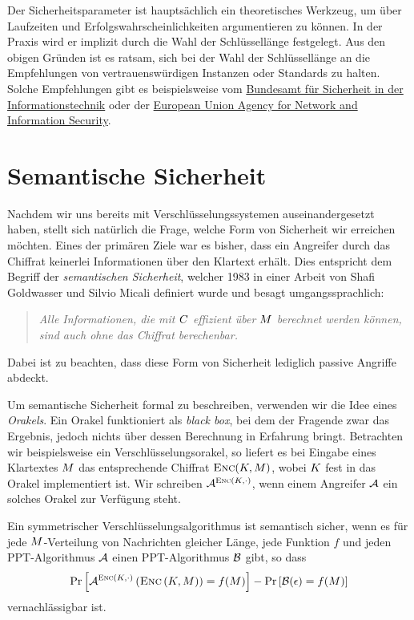 Der Sicherheitsparameter ist hauptsächlich ein theoretisches Werkzeug, um über Laufzeiten und Erfolgswahrscheinlichkeiten argumentieren zu können. In der Praxis wird er implizit durch die Wahl der Schlüssellänge festgelegt. Aus den obigen Gründen ist es ratsam, sich bei der Wahl der Schlüssellänge an die Empfehlungen von vertrauenswürdigen Instanzen oder Standards zu halten. Solche Empfehlungen gibt es beispielsweise vom \href{https://www.bsi.bund.de/DE/Publikationen/TechnischeRichtlinien/tr02102/index_htm.html}{Bundesamt für Sicherheit in der Informationstechnik} oder der \href{https://www.enisa.europa.eu/activities/identity-and-trust/library/deliverables/algorithms-key-size-and-parameters-report-2014}{European Union Agency for Network and Information Security}.

\section{Semantische Sicherheit}\label{ch:sicherheitsbegriffe:semantischesicherheit}
Nachdem wir uns bereits mit Verschlüsselungssystemen auseinandergesetzt haben, stellt sich natürlich die Frage, welche Form von Sicherheit wir erreichen möchten. 
Eines der primären Ziele war es bisher, dass ein Angreifer durch das Chiffrat keinerlei Informationen über den Klartext erhält. Dies entspricht dem Begriff der \emph{semantischen Sicherheit},
welcher 1983 in einer Arbeit von Shafi Goldwasser und Silvio Micali \cite{Goldwasser1984} definiert wurde und besagt umgangssprachlich:
\begin{quote}
	\emph{Alle Informationen, die mit $C$ effizient über $M$ berechnet werden können, sind auch ohne das Chiffrat berechenbar.}
\end{quote}
Dabei ist zu beachten, dass diese Form von Sicherheit lediglich passive Angriffe abdeckt.

Um semantische Sicherheit formal zu beschreiben, verwenden wir die Idee
eines \emph{Orakels}. Ein Orakel funktioniert als \emph{black box}, bei
dem der Fragende zwar das Ergebnis, jedoch nichts über dessen Berechnung
in Erfahrung bringt. Betrachten wir beispielsweise ein
Verschlüsselungsorakel, so liefert es bei Eingabe eines Klartextes
$M$ das entsprechende Chiffrat $\textsc{Enc}(K, M)$, wobei $K$
fest in das Orakel implementiert ist. Wir schreiben $\mathcal{A}^{\textsc{Enc} (K,
  \cdot)}$, wenn einem Angreifer $\mathcal{A}$ ein solches Orakel zur Verfügung steht.

\begin{definition}\label{def:semsec}
Ein symmetrischer Verschlüsselungsalgorithmus ist semantisch sicher, wenn es für jede $M$-Verteilung von Nachrichten gleicher Länge, jede Funktion $f$ und jeden PPT-Algorithmus $\mathcal{A}$ einen PPT-Algorithmus $\mathcal{B}$ gibt, so dass
\begin{align*}
	\text{Pr}\left[ \mathcal{A}^{\textsc{Enc} (K,\cdot)} \left( \textsc{Enc} \left( K, M \right) \right) = f(M) \right] - \text{Pr} \left[ \mathcal{B} (\epsilon) = f (M) \right]
\end{align*}
vernachlässigbar ist.
\end{definition}

